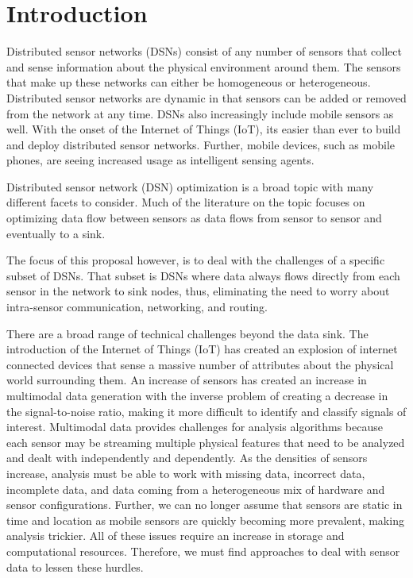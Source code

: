 \chapter{Introduction}
Distributed sensor networks (DSNs) consist of any number of sensors that collect and sense information about the physical environment around them. The sensors that make up these networks can either be homogeneous or heterogeneous. Distributed sensor networks are dynamic in that sensors can be added or removed from the network at any time. DSNs also increasingly include mobile sensors as well. With the onset of the Internet of Things (IoT), its easier than ever to build and deploy distributed sensor networks. Further, mobile devices, such as mobile phones, are seeing increased usage as intelligent sensing agents.

Distributed sensor network (DSN) optimization is a broad topic with many different facets to consider. Much of the literature on the topic focuses on optimizing data flow between sensors as data flows from sensor to sensor and eventually to a sink. 

The focus of this proposal however, is to deal with the challenges of a specific subset of DSNs. That subset is DSNs where data always flows directly from each sensor in the network to sink nodes, thus, eliminating the need to worry about intra-sensor communication, networking, and routing. 

There are a broad range of technical challenges beyond the data sink. The introduction of the Internet of Things (IoT) has created an explosion of internet connected devices that sense a massive number of attributes about the physical world surrounding them. An increase of sensors has created an increase in multimodal data generation with the inverse problem of creating a decrease in the signal-to-noise ratio, making it more difficult to identify and classify signals of interest. Multimodal data provides challenges for analysis algorithms because each sensor may be streaming multiple physical features that need to be analyzed and dealt with independently and dependently. As the densities of sensors increase, analysis must be able to work with missing data, incorrect data, incomplete data, and data coming from a heterogeneous mix of hardware and sensor configurations. Further, we can no longer assume that sensors are static in time and location as mobile sensors are quickly becoming more prevalent, making analysis trickier. All of these issues require an increase in storage and computational resources. Therefore, we must find approaches to deal with sensor data to lessen these hurdles.

